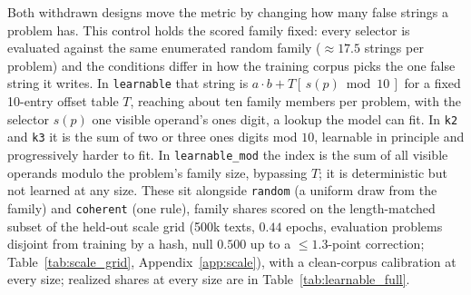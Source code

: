 \documentclass{article}
\begin{document}
Both withdrawn designs move the metric by changing how many false strings a problem has. This control holds the scored family fixed: every selector is evaluated against the same enumerated random family (${\approx}17.5$ strings per problem) and the conditions differ in how the training corpus picks the one false string it writes. In \texttt{learnable} that string is $a{\cdot}b + T[\,s(p)\bmod 10\,]$ for a fixed 10-entry offset table $T$, reaching about ten family members per problem, with the selector $s(p)$ one visible operand's ones digit, a lookup the model can fit. In \texttt{k2} and \texttt{k3} it is the sum of two or three ones digits mod $10$, learnable in principle and progressively harder to fit. In \texttt{learnable\_mod} the index is the sum of all visible operands modulo the problem's family size, bypassing $T$; it is deterministic but not learned at any size. These sit alongside \texttt{random} (a uniform draw from the family) and \texttt{coherent} (one rule), family shares scored on the length-matched subset of the held-out scale grid (500k texts, $0.44$ epochs, evaluation problems disjoint from training by a hash, null $0.500$ up to a ${\leq}1.3$-point correction; Table~\ref{tab:scale_grid}, Appendix~\ref{app:scale}), with a clean-corpus calibration at every size; realized shares at every size are in Table~\ref{tab:learnable_full}.
\end{document}
